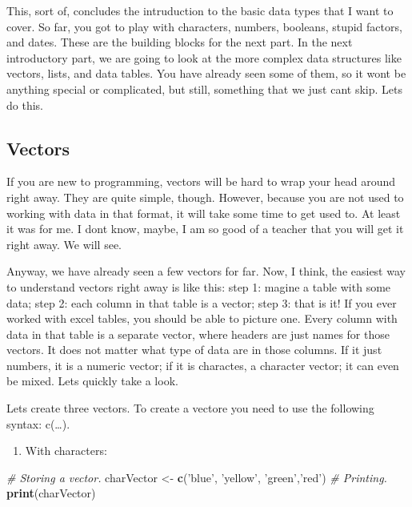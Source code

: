 \documentclass[]{book}
\newenvironment{Shaded}{\begin{snugshade}}{\end{snugshade}}
\newcommand{\CommentTok}[1]{\textcolor[rgb]{0.56,0.35,0.01}{\textit{#1}}}
\newcommand{\KeywordTok}[1]{\textcolor[rgb]{0.13,0.29,0.53}{\textbf{#1}}}
\newcommand{\NormalTok}[1]{#1}
\newcommand{\StringTok}[1]{\textcolor[rgb]{0.31,0.60,0.02}{#1}}
\providecommand{\tightlist}{%
  \setlength{\itemsep}{0pt}\setlength{\parskip}{0pt}}
\begin{document}
This, sort of, concludes the intruduction to the basic data types that I want to cover. So far, you got to play with characters, numbers, booleans, stupid factors, and dates. These are the building blocks for the next part. In the next introductory part, we are going to look at the more complex data structures like vectors, lists, and data tables. You have already seen some of them, so it wont be anything special or complicated, but still, something that we just cant skip. Lets do this.

\hypertarget{vectors}{%
\subsection{Vectors}\label{vectors}}

If you are new to programming, vectors will be hard to wrap your head around right away. They are quite simple, though. However, because you are not used to working with data in that format, it will take some time to get used to. At least it was for me. I dont know, maybe, I am so good of a teacher that you will get it right away. We will see.

Anyway, we have already seen a few vectors for far. Now, I think, the easiest way to understand vectors right away is like this: step 1: magine a table with some data; step 2: each column in that table is a vector; step 3: that is it! If you ever worked with excel tables, you should be able to picture one. Every column with data in that table is a separate vector, where headers are just names for those vectors. It does not matter what type of data are in those columns. If it just numbers, it is a numeric vector; if it is charactes, a character vector; it can even be mixed. Lets quickly take a look.

Lets create three vectors. To create a vectore you need to use the following syntax: c(\ldots{}).

\begin{enumerate}
\def\labelenumi{\arabic{enumi}.}
\tightlist
\item
  With characters:
\end{enumerate}

\begin{Shaded}
\begin{Highlighting}[]
\CommentTok{# Storing a vector.}
\NormalTok{charVector <-}\StringTok{ }\KeywordTok{c}\NormalTok{(}\StringTok{'blue'}\NormalTok{, }\StringTok{'yellow'}\NormalTok{, }\StringTok{'green'}\NormalTok{,}\StringTok{'red'}\NormalTok{)}
\CommentTok{# Printing.}
\KeywordTok{print}\NormalTok{(charVector)}
\end{Highlighting}
\end{Shaded}
\end{document}

